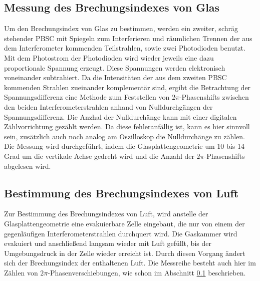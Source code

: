 \subsection{Messung des Brechungsindexes von Glas}
\label{subsec:glas}
Um den Brechungsindex von Glas zu bestimmen, werden ein zweiter, schräg stehender PBSC mit Spiegeln zum Interferieren und räumlichen Trennen der aus dem Interferometer kommenden Teilstrahlen, sowie zwei Photodioden benutzt. Mit dem Photostrom der Photodioden wird wieder jeweils eine dazu proportionale Spannung erzeugt. Diese Spannungen werden elektronisch voneinander subtrahiert. Da die Intensitäten der aus dem zweiten PBSC kommenden Strahlen zueinander komplementär sind, ergibt die Betrachtung der Spannungsdifferenz eine Methode zum Feststellen von $2\pi$-Phasenshifts zwischen den beiden Interferometerstrahlen anhand von Nulldurchgängen der Spannungsdifferenz. Die Anzhal der Nulldurchänge kann mit einer digitalen Zählvorrichtung gezählt werden. Da diese fehleranfällig ist, kann es hier sinnvoll sein, zusätzlich auch noch analog am Oszilloskop die Nulldurchänge zu zählen. Die Messung wird durchgeführt, indem die Glasplattengeometrie um 10 bis 14 Grad um die vertikale Achse gedreht wird und die Anzahl der $2\pi$-Phasenshifts abgelesen wird.


\subsection{Bestimmung des Brechungsindexes von Luft}
Zur Bestimmung des Brechungsindexes von Luft, wird anstelle der Glasplattengeometrie eine evakuierbare Zelle eingebaut, die nur von einem der gegenläufigen Interferometerstrahlen durchquert wird. Die Gaskammer wird evakuiert und anschließend langsam wieder mit Luft gefüllt, bis der Umgebungsdruck in der Zelle wieder erreicht ist. Durch diesen Vorgang ändert sich der Brechungsindex der enthaltenen Luft. Die Messreihe besteht auch hier im Zählen von $2\pi$-Phasenverschiebungen, wie schon im Abschnitt \ref{subsec:glas} beschrieben.
